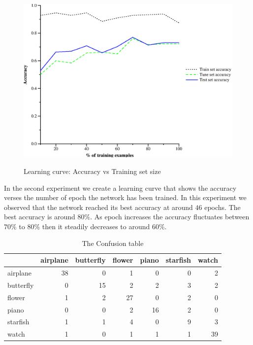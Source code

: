 \documentclass{article}
\begin{document}
\begin{figure}[!ht]
 \centering
  \includegraphics[width=4.8in]{size.eps}
 \label{trainsize}
 \caption{Learning curve: Accuracy vs Training set size}
\end{figure}


In the second experiment we create a learning curve that shows the accuracy verses the number of epoch the network has been trained. In this experiment we observed that the network reached its best accuracy at around $46$ epochs. The best accuracy is around $80\%$. As epoch increases the accuracy fluctuates between $70\%$ to $80\%$ then it steadily decreases to around $60\%$. 

\begin{table}[ht]
  \caption{The Confusion table}
  \centering 
  \begin{tabular}{ | l | r | r | r| r | r | r |}
    \hline
                & airplane & butterfly  & flower    &   piano  &  starfish &   watch\\ \hline
    airplane    &    38    &     0      &     1     &     0    &      0    &     2 \\ 
   butterfly    &    0     &    15      &     2     &     2    &      3    &     2 \\
      flower    &    1     &     2      &    27     &     0    &      2    &     0 \\
       piano    &    0     &     0      &     2     &    16    &      2    &     0 \\
    starfish    &    1     &     1      &     4     &     0    &      9    &     3 \\
       watch    &    1     &     0      &     1     &     1    &      1    &    39 \\
    \hline
  \end{tabular}
\end{table}
\end{document}
